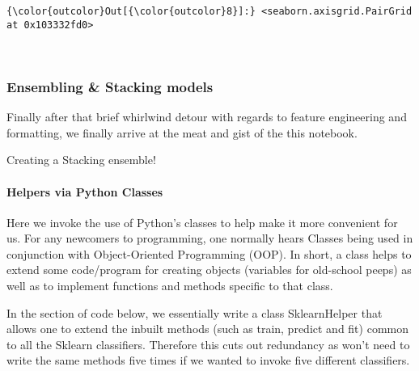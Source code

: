\documentclass[11pt]{article}
\begin{document}
\begin{Verbatim}[commandchars=\\\{\}]
{\color{outcolor}Out[{\color{outcolor}8}]:} <seaborn.axisgrid.PairGrid at 0x103332fd0>
\end{Verbatim}
            
    \begin{center}
    \end{center}
    { \hspace*{\fill} \\}
    
    \subsubsection{Ensembling \& Stacking
models}\label{ensembling-stacking-models}

Finally after that brief whirlwind detour with regards to feature
engineering and formatting, we finally arrive at the meat and gist of
the this notebook.

Creating a Stacking ensemble!

\paragraph{Helpers via Python Classes}\label{helpers-via-python-classes}

Here we invoke the use of Python's classes to help make it more
convenient for us. For any newcomers to programming, one normally hears
Classes being used in conjunction with Object-Oriented Programming
(OOP). In short, a class helps to extend some code/program for creating
objects (variables for old-school peeps) as well as to implement
functions and methods specific to that class.

In the section of code below, we essentially write a class SklearnHelper
that allows one to extend the inbuilt methods (such as train, predict
and fit) common to all the Sklearn classifiers. Therefore this cuts out
redundancy as won't need to write the same methods five times if we
wanted to invoke five different classifiers.
\end{document}
